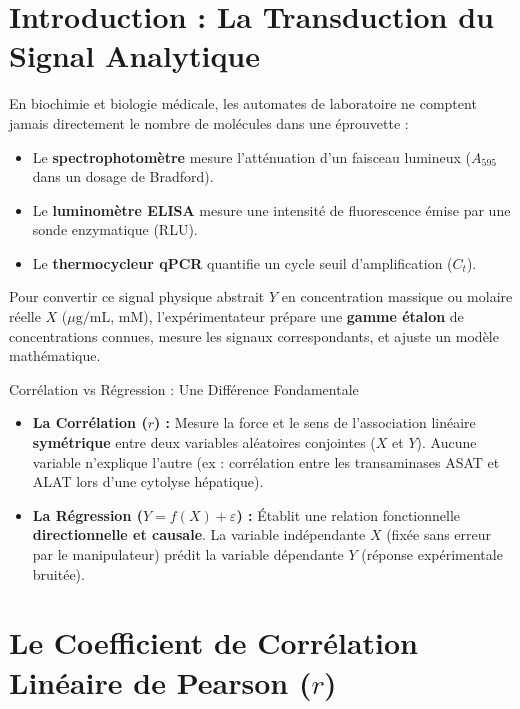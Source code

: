 \documentclass[11pt,a4paper]{article}
\begin{document}

\section{Introduction : La Transduction du Signal Analytique}

En biochimie et biologie médicale, les automates de laboratoire ne comptent jamais directement le nombre de molécules dans une éprouvette :
\begin{itemize}[leftmargin=*, label=\faAngleRight]
  \item Le \textbf{spectrophotomètre} mesure l'atténuation d'un faisceau lumineux ($A_{595}$ dans un dosage de Bradford).
  \item Le \textbf{luminomètre ELISA} mesure une intensité de fluorescence émise par une sonde enzymatique (RLU).
  \item Le \textbf{thermocycleur qPCR} quantifie un cycle seuil d'amplification ($C_t$).
\end{itemize}

Pour convertir ce signal physique abstrait $Y$ en concentration massique ou molaire réelle $X$ ($\mu\text{g/mL}$, $\text{mM}$), l'expérimentateur prépare une \textbf{gamme étalon} de concentrations connues, mesure les signaux correspondants, et ajuste un modèle mathématique.

\begin{conceptbox}{Corrélation vs Régression : Une Différence Fondamentale}
\begin{itemize}[leftmargin=*, label=\faCheck]
  \item \textbf{La Corrélation ($r$) :} Mesure la force et le sens de l'association linéaire \textbf{symétrique} entre deux variables aléatoires conjointes ($X$ et $Y$). Aucune variable n'explique l'autre (ex : corrélation entre les transaminases ASAT et ALAT lors d'une cytolyse hépatique).
  \item \textbf{La Régression ($Y = f(X) + \varepsilon$) :} Établit une relation fonctionnelle \textbf{directionnelle et causale}. La variable indépendante $X$ (fixée sans erreur par le manipulateur) prédit la variable dépendante $Y$ (réponse expérimentale bruitée).
\end{itemize}
\end{conceptbox}

\section{Le Coefficient de Corrélation Linéaire de Pearson ($r$)}
\end{document}

